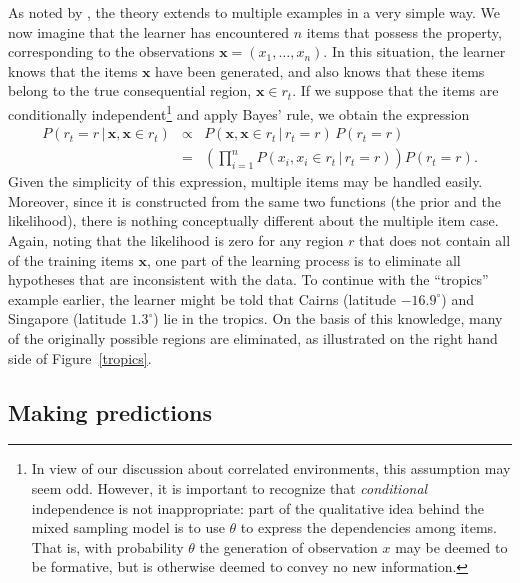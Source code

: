 \documentclass[doc]{apa6}
\newcommand{\xn}{{\bm{x}}}
\newcommand{\rt}{{r_t}}
\newcommand{\condon}{\, | \,}
\newcommand{\pgap}{\,}
\begin{document}
As noted by , the theory extends to multiple examples in a very simple way. We now imagine that the learner has encountered $n$ items that possess the property, corresponding to the observations $\bm{x} = (x_1,\ldots,x_n)$. In this situation, the learner knows that the items $\bm{x}$ have been generated, and also knows that these items belong to the true consequential region, $\bm{x} \in \rt$. If we suppose that the items are conditionally independent\footnote{In view of our discussion about correlated environments, this assumption may seem odd. However, it is important to recognize that {\it conditional} independence is not inappropriate: part of the qualitative idea behind the mixed sampling model is to use $\theta$ to express the dependencies among items. That is, with probability $\theta$ the generation of observation $x$ may be deemed to be formative, but is otherwise deemed to convey no new information.} and apply Bayes' rule, we obtain the expression
\begin{eqnarray}
P(\rt = r \condon  \bm{x}, \bm{x} \in \rt) &\propto& P(\bm{x}, \bm{x} \in \rt \condon  \rt = r) \pgap P(\rt = r) \\
&=& \left( \prod_{i=1}^n P(x_i, x_i \in \rt \condon  \rt = r) \right) P(\rt = r).
\end{eqnarray}
Given the simplicity of this expression, multiple items may be handled easily. Moreover, since it is constructed from the same two functions (the prior and the likelihood), there is nothing conceptually different about the multiple item case. Again, noting that the likelihood is zero for any region $r$ that does not contain all of the training items $\xn$, one part of the learning process is to eliminate all hypotheses that are inconsistent with the data. To continue with the ``tropics'' example earlier, the learner might be told that Cairns (latitude $-16.9^\circ$) and Singapore (latitude $1.3^\circ$) lie in the tropics. On the basis of this knowledge, many of the originally possible regions are eliminated, as illustrated on the right hand side of Figure~\ref{tropics}.

\subsection{Making predictions}
\end{document}
